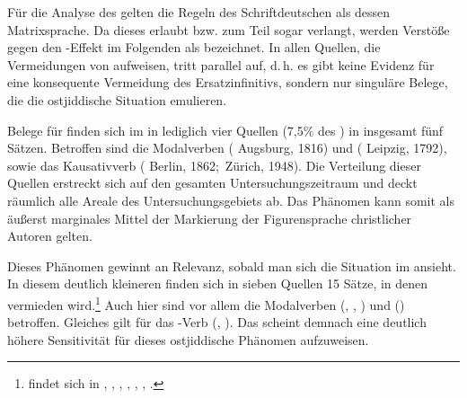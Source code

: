  
 
 Für die Analyse des \hai{{\LiJi}} gelten die Regeln des Schriftdeutschen
als dessen Matrixsprache. Da dieses \hai{{\IPP}} erlaubt bzw. zum Teil sogar verlangt, werden Verstöße gegen den \hai{{\IPP}}-Effekt im Folgenden als  bezeichnet. In allen Quellen, die Vermeidungen von \hai{{\IPP}} aufweisen, tritt \hai{{\IPP}} parallel auf, d.\,h. es gibt keine Evidenz für eine konsequente Vermeidung des Ersatzinfinitivs, sondern nur singuläre Belege, die die ostjiddische Situation emulieren.

Belege für  finden sich im  in lediglich vier Quellen (7,5\% des ) in insgesamt fünf Sätzen. Betroffen sind die Modalverben  ( Augsburg, 1816) und  ( Leipzig, 1792), sowie das 
Kausativverb  ( Berlin, 1862;\,  Zürich, 1948). Die Verteilung dieser Quellen erstreckt sich auf den gesamten Untersuchungszeitraum und deckt räumlich alle Areale des Untersuchungsgebiets ab. Das Phänomen kann somit als äußerst marginales Mittel der Markierung der Figurensprache christlicher Autoren gelten.

Dieses Phänomen gewinnt an Relevanz, sobald man sich die Situation im  ansieht. In diesem deutlich kleineren  finden sich in sieben Quellen 15 Sätze, in denen \hai{{\IPP}} vermieden wird.\footnote{ findet sich in , , , , , , .} Auch hier sind vor allem die Modalverben  (, , ) und  () betroffen. Gleiches gilt für das \hai{{\ACI}}-Verb %
  (, ).
Das  scheint demnach eine deutlich höhere Sensitivität für dieses ostjiddische Phänomen aufzuweisen.


